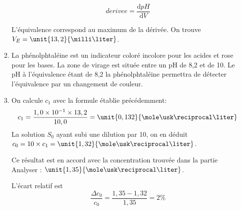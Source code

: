 \documentclass[a4paper,10pt]{article}
\begin{document}
\begin{enumerate}
\[
    derivee = \frac{\mathrm{d}pH}{\mathrm{d}V}
\]
\begin{center}
\end{center}
L'équivalence correspond au maximum de la dérivée. On trouve $V_E=\unit{13,2}{\milli\liter}$.
\item La phénolphtaléine est un indicateur coloré incolore pour les acides et rose pour les bases. La zone de virage est située entre un pH de 8,2 et de 10. Le pH à l'équivalence étant de 8,2 la phénolphtaléine permettra de détecter l'équivalence par un changement de couleur.
\item On calcule $c_1$ avec la formule établie précédemment:
\[
c_1=\frac{1,0\times 10^{-1}\times 13,2}{10,0}=\unit{0,132}{\mole\usk\reciprocal\liter}
\]
La solution $S_0$ ayant subi une dilution par 10, on en déduit $c_0=10\times c_1=\unit{1,32}{\mole\usk\reciprocal\liter}$.

Ce résultat est en accord avec la concentration trouvée dans la partie Analyser : $\unit{1,35}{\mole\usk\reciprocal\liter}$.

L'écart relatif est 
\[\frac{\Delta c_0}{c_0}=\frac{1,35-1,32}{1,35}=2\%\]
\end{enumerate}
\end{document}
